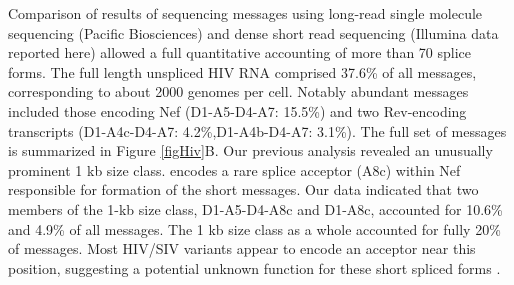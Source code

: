 \documentclass[../sherrill-Mix_thesis.tex]{subfiles}
\begin{document}
	Comparison of results of sequencing \hivEight{} messages using long-read single molecule sequencing (Pacific Biosciences) and dense short read sequencing (Illumina data reported here) allowed a full quantitative accounting of more than 70 \hivEight{} splice forms.  The full length unspliced HIV RNA comprised 37.6\% of all messages, corresponding to about 2000 genomes per cell. Notably abundant messages included those encoding Nef (D1-A5-D4-A7: 15.5\%) and two Rev-encoding transcripts (D1-A4c-D4-A7: 4.2\%,D1-A4b-D4-A7: 3.1\%).  The full set of messages is summarized in Figure \ref{figHiv}B. Our previous analysis revealed an unusually prominent 1 kb size class. \hivEight{} encodes a rare splice acceptor (A8c) within Nef responsible for formation of the short messages.  Our data indicated that two members of the 1-kb size class, D1-A5-D4-A8c and D1-A8c, accounted for 10.6\% and 4.9\% of all messages. The  1 kb size class as a whole accounted for fully 20\% of messages. Most HIV/SIV variants appear to encode an acceptor near this position, suggesting a potential unknown function for these short spliced forms \citep{Smith1992,Carrera2010,Ocwieja2012}.
\end{document}
